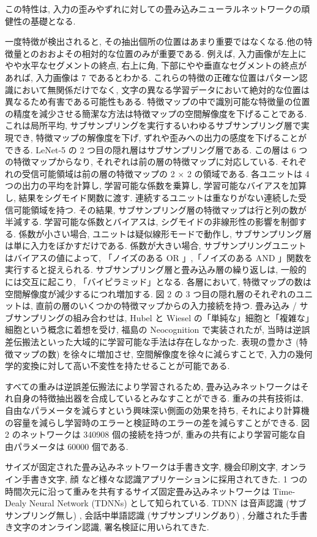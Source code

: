 \documentclass[twocolumn]{jarticle}     %
\begin{document}
この特性は, 入力の歪みやずれに対しての畳み込みニューラルネットワークの頑健性の基礎となる.
\par
一度特徴が検出されると, その抽出個所の位置はあまり重要ではなくなる.他の特徴量とのおおよその相対的な位置のみが重要である. 例えば, 入力画像が左上にやや水平なセグメントの終点, 右上に角, 下部にやや垂直なセグメントの終点があれば, 入力画像は 7 であるとわかる. これらの特徴の正確な位置はパターン認識において無関係だけでなく, 文字の異なる学習データにおいて絶対的な位置は異なるため有害である可能性もある.
特徴マップの中で識別可能な特徴量の位置の精度を減少させる簡潔な方法は特徴マップの空間解像度を下げることである. これは局所平均, サブサンプリングを実行するいわゆるサブサンプリング層で実現でき, 特徴マップの解像度を下げ, ずれや歪みへの出力の感度を下げることができる.
LeNet-5 の 2 つ目の隠れ層はサブサンプリング層である. この層は 6 つの特徴マップからなり, それぞれは前の層の特徴マップに対応している. それぞれの受信可能領域は前の層の特徴マップの 2 × 2 の領域である. 各ユニットは 4 つの出力の平均を計算し, 学習可能な係数を乗算し, 学習可能なバイアスを加算し, 結果をシグモイド関数に渡す. 連続するユニットは重なりがない連続した受信可能領域を持つ. その結果, サブサンプリング層の特徴マップは行と列の数が半減する. 学習可能な係数とバイアスは, シグモイドの非線形性の影響を制御する. 係数が小さい場合, ユニットは疑似線形モードで動作し, サブサンプリング層は単に入力をぼかすだけである. 係数が大きい場合, サブサンプリングユニットはバイアスの値によって, 「ノイズのある OR 」,「ノイズのある AND 」関数を実行すると捉えられる.
サブサンプリング層と畳み込み層の繰り返しは, 一般的には交互に起こり, 「バイピラミッド」となる. 各層において, 特徴マップの数は空間解像度が減少するにつれ増加する. 図 2 の 3 つ目の隠れ層のそれぞれのユニットは, 直前の層のいくつかの特徴マップからの入力接続を持つ. 畳み込み / サブサンプリングの組み合わせは, Hubel と Wiesel の「単純な」細胞と「複雑な」細胞という概念に着想を受け, 福島の Neocognition で実装されたが, 当時は逆誤差伝搬法といった大域的に学習可能な手法は存在しなかった.
表現の豊かさ (特徴マップの数) を徐々に増加させ, 空間解像度を徐々に減らすことで, 入力の幾何学的変換に対して高い不変性を持たせることが可能である.
\par 
すべての重みは逆誤差伝搬法により学習されるため, 畳み込みネットワークはそれ自身の特徴抽出器を合成しているとみなすことができる. 重みの共有技術は, 自由なパラメータを減らすという興味深い側面の効果を持ち, それにより計算機の容量を減らし学習時のエラーと検証時のエラーの差を減らすことができる. 図 2 のネットワークは 340908 個の接続を持つが, 重みの共有により学習可能な自由パラメータは 60000 個である.
\par
サイズが固定された畳み込みネットワークは手書き文字, 機会印刷文字, オンライン手書き文字, 顔 など様々な認識アプリケーションに採用されてきた. 
 1 つの時間次元に沿って重みを共有するサイズ固定畳み込みネットワークは Time-Dealy Neural Network (TDNNs) として知られている. TDNN は音声認識 (サブサンプリング無し) , 会話中単語認識 (サブサンプリングあり) , 分離された手書き文字のオンライン認識, 署名検証に用いられてきた.
\end{document}
